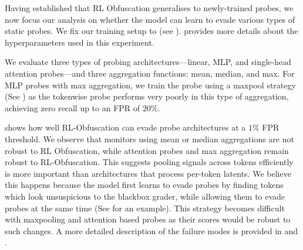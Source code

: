 Having established that RL Obfuscation generalises to newly-trained probes, we now focus our analysis on whether the model can learn to evade various types of static probes. We fix our training setup to \setupStatic \space (see ).  provides more details about the hyperparameters used in this experiment.

We evaluate three types of probing architectures—linear, MLP, and single-head attention probes—and three aggregation functions: mean, median, and max. For MLP probes with max aggregation, we train the probe using a maxpool strategy (See ) as the tokenwise probe performs very poorly in this type of aggregation, achieving zero recall up to an FPR of $20\%$. 

 shows how well RL-Obfuscation can evade probe architectures at a $1\%$ FPR threshold. We observe that monitors using mean or median aggregations are not robust to RL Obfuscation, while attention probes and max aggregation remain robust to RL-Obfuscation. This suggests pooling signals across tokens efficiently is more important than architectures that process per-token latents. We believe this happens because the model first learns to evade probes by finding tokens which look unsuspicious to the blackbox grader, while allowing them to evade probes at the same time (See  for an example). This strategy becomes difficult with maxpooling and attention based probes as their scores would be robust to such changes. A more detailed description of the failure modes is provided in  and .

\begin{table}[t]
    \centering
    
    \caption{Evasion Rate (1 - Recall) at $1\%$ FPR and StrongReject Reward (SRR) for Qwen 2.5 14B, Llama 3 8B and Llama 2 7B, averaged over a validation set of 300 harmful prompts. The StrongReject Grader ~\citep{souly2024strongreject} assigns a prompt and its generated completion a score between $1$ and $5$.}
    \label{tab:other_models}
    \vspace{-18pt}
\end{table}

\vspace{-6pt}
